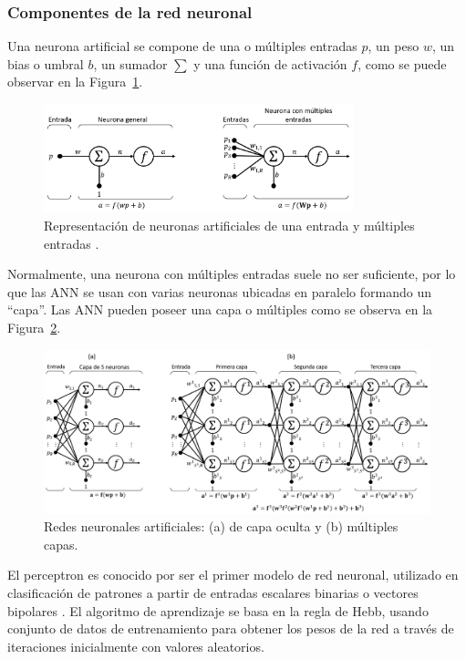  \subsubsection{Componentes de la red neuronal}

 Una neurona artificial se compone de una o múltiples entradas $p$, un peso $w$, un bias o umbral $b$, un sumador $\sum$ y una función de activación $f$, como se puede observar en la Figura~\ref{fig:Neu_Diag}. 

 \begin{figure}[!h]
     \centering
     \includegraphics[width=0.8\textwidth]
     {Imagenes/Neu_Diag.png}
     \caption{Representación de neuronas artificiales de una entrada y múltiples entradas \citep{NeuronalNet2014}.}
\label{fig:Neu_Diag}
 \end{figure}

 Normalmente, una neurona con múltiples entradas suele no ser suficiente, por lo que las ANN se usan con varias neuronas ubicadas en paralelo formando un “capa”. Las ANN pueden poseer una capa o múltiples como se observa en la Figura~\ref{fig:Net_conjunt}.

  \begin{figure}[!h]
     \centering
     \includegraphics[width=.9\textwidth]{Imagenes/ConjuntoANN.png}
     \caption{Redes neuronales artificiales: (a) de capa oculta y (b) múltiples capas.}
    \label{fig:Net_conjunt}
 \end{figure}


El perceptron es conocido por ser el primer modelo de red neuronal, utilizado en clasificación de patrones a partir de entradas escalares binarias o vectores bipolares \citep{rosenblatt1958perceptron}. El algoritmo de aprendizaje se basa en la regla de Hebb, usando conjunto de datos de entrenamiento  para obtener los pesos de la red a través de iteraciones inicialmente con valores aleatorios.

